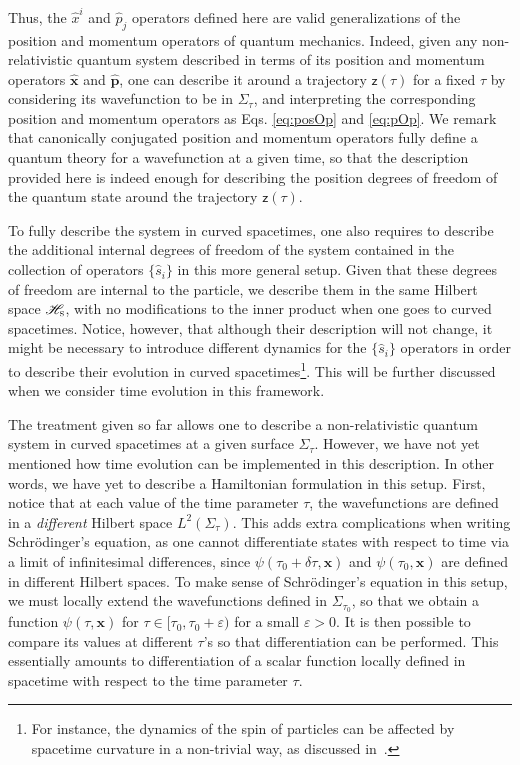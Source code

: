 \documentclass[letterpaper,12pt,titlepage,oneside,final]{book}
\newcommand{\mf}{\mathsf}%
\begin{document}
Thus, the $\hat{x}^i$ and $\hat{p}_j$ operators defined here are valid generalizations of the position and momentum operators of quantum mechanics. Indeed, given any non-relativistic quantum system described in terms of its position and momentum operators $\hat{\bm x}$ and $\hat{\bm p}$, one can describe it around a trajectory $\mf z(\tau)$ for a fixed $\tau$ by considering its wavefunction to be in $\Sigma_\tau$, and interpreting the corresponding position and momentum operators as Eqs. \eqref{eq:posOp} and \eqref{eq:pOp}. We remark that canonically conjugated position and momentum operators fully define a quantum theory for a wavefunction at a given time, so that the description provided here is indeed enough for describing the position degrees of freedom of the quantum state around the trajectory $\mf z(\tau)$.

To fully describe the system in curved spacetimes, one also requires to describe the additional internal degrees of freedom of the system contained in the collection of operators $\{\hat{s}_i\}$ in this more general setup. Given that these degrees of freedom are internal to the particle, we describe them in the same Hilbert space $\mathscr{H}_\textsc{s}$, with no modifications to the inner product when one goes to curved spacetimes. Notice, however, that although their description will not change, it might be necessary to introduce different dynamics for the $\{\hat{s}_i\}$ operators in order to describe their evolution in curved spacetimes\footnote{For instance, the dynamics of the spin of particles can be affected by spacetime curvature in a non-trivial way, as discussed in~\cite{parker,jonas,theguy,Nico}.}. This will be further discussed when we consider time evolution in this framework. 

The treatment given so far allows one to describe a non-relativistic quantum system in curved spacetimes at a given surface $\Sigma_\tau$. However, we have not yet mentioned how time evolution can be implemented in this description. In other words, we have yet to describe a Hamiltonian formulation in this setup. First, notice that at each value of the time parameter $\tau$, the wavefunctions are defined in a \emph{different} Hilbert space $L^2(\Sigma_\tau)$. This adds extra complications when writing Schr\"odinger's equation, as one cannot differentiate states with respect to time via a limit of infinitesimal differences, since $\psi(\tau_0+\delta\tau,\bm x)$ and $\psi(\tau_0,\bm x)$ are defined in different Hilbert spaces. To make sense of Schr\"odinger's equation in this setup, we must locally extend the wavefunctions defined in $\Sigma_{\tau_0}$, so that we obtain a function $\psi(\tau,\bm x)$ for $\tau\in[\tau_0,\tau_0 + \varepsilon)$ for a small $\varepsilon>0$. It is then possible to compare its values at different $\tau$'s so that differentiation can be performed. This essentially amounts to differentiation of a scalar function locally defined in spacetime with respect to the time parameter $\tau$.
\end{document}
